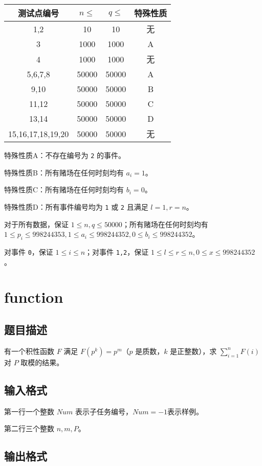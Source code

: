 \documentclass[UTF8]{article}
\begin{document}
\begin{tabular}{|c|c|c|c|}
	\hline
	测试点编号 & $n\leq$ & $q\leq$ & 特殊性质\\
	\hline
	1,2 & 10 & 10 & 无\\
	\hline
	3 & 1000 & 1000 & A\\
	\hline
	4 & 1000 & 1000 & 无\\
	\hline
	5,6,7,8 & 50000 & 50000 & A\\
	\hline
	9,10 & 50000 & 50000 & B\\
	\hline
	11,12 & 50000 & 50000 & C\\
	\hline
	13,14 & 50000 & 50000 & D\\
	\hline
	15,16,17,18,19,20 & 50000 & 50000 & 无\\
	\hline
\end{tabular}

特殊性质A：不存在编号为 \texttt{2} 的事件。

特殊性质B：所有赌场在任何时刻均有 $a_i=1$。

特殊性质C：所有赌场在任何时刻均有 $b_i=0$。

特殊性质D：所有事件编号均为 \texttt{1} 或 \texttt{2} 且满足 $l=1,r=n$。

对于所有数据，保证 $1\leq n,q \leq 50000$；所有赌场在任何时刻均有 $1\leq p_i\leq 998244353,1\leq a_i\leq 998244352,0\leq b_i\leq 998244352$。

对事件 \texttt{0}，保证 $1\leq i\leq n$；对事件 \texttt{1,2}，保证 $1\leq l\leq r\leq n,0\leq x\leq 998244352$。 
\newpage
\section{function}
\subsection{题目描述}

有一个积性函数 $F$ 满足 $F(p^k)=p^m$（$p$ 是质数，$k$ 是正整数），求 $\sum\limits_{i=1}^n F(i)$ 对 $P$ 取模的结果。

\subsection{输入格式}

第一行一个整数 $Num$ 表示子任务编号，$Num=-1$表示样例。

第二行三个整数 $n,m,P$。

\subsection{输出格式}
\end{document}
